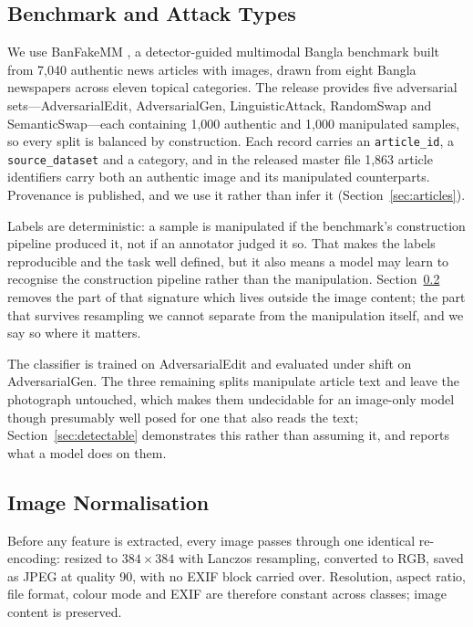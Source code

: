 \subsection{Benchmark and Attack Types}
\label{sec:data}

We use BanFakeMM \cite{banfakemm}, a detector-guided multimodal Bangla
benchmark built from 7{,}040 authentic news articles with images, drawn from
eight Bangla newspapers across eleven topical categories. The release provides
five adversarial sets---AdversarialEdit, AdversarialGen, LinguisticAttack,
RandomSwap and SemanticSwap---each containing 1{,}000 authentic and 1{,}000
manipulated samples, so every split is balanced by construction. Each record
carries an \texttt{article\_id}, a \texttt{source\_dataset} and a category, and
in the released master file 1{,}863 article identifiers carry both an authentic
image and its manipulated counterparts. Provenance is published, and we use it
rather than infer it (Section~\ref{sec:articles}).

Labels are deterministic: a sample is manipulated if the benchmark's
construction pipeline produced it, not if an annotator judged it so. That makes
the labels reproducible and the task well defined, but it also means a model
may learn to recognise the construction pipeline rather than the manipulation.
Section~\ref{sec:normalise} removes the part of that signature which lives
outside the image content; the part that survives resampling we cannot separate
from the manipulation itself, and we say so where it matters.

The classifier is trained on AdversarialEdit and evaluated under shift on
AdversarialGen. The three remaining splits manipulate article text and leave
the photograph untouched, which makes them undecidable for an image-only model
though presumably well posed for one that also reads the text;
Section~\ref{sec:detectable} demonstrates this rather than assuming it, and
reports what a model does on them.

\subsection{Image Normalisation}
\label{sec:normalise}

Before any feature is extracted, every image passes through one identical
re-encoding: resized to $384 \times 384$ with Lanczos resampling, converted to
RGB, saved as JPEG at quality 90, with no EXIF block carried over. Resolution,
aspect ratio, file format, colour mode and EXIF are therefore constant across
classes; image content is preserved.

